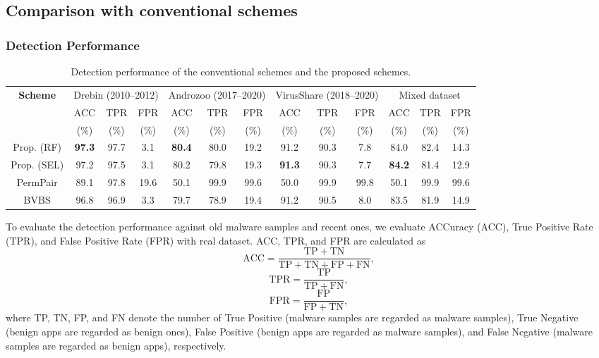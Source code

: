 \documentclass{ieeeaccess}
\begin{document}
\subsection{Comparison with conventional schemes} \label{sec:comparison}
\subsubsection{Detection Performance} \label{sec:detection_performance}
\begin{table}[t]
  \begin{center}
    \caption{Detection performance of the conventional schemes and the proposed schemes.}
    \label{tab:detection_performance} 
    \begin{tabular}{|c|c|c|c|c|c|c|c|c|c|c|c|c|} 
      \hline
      \multirow{3}{*}{\textbf{Scheme}} & \multicolumn{3}{c|}{Drebin (2010--2012) } & \multicolumn{3}{c|}{Androzoo (2017--2020)} & \multicolumn{3}{c|}{VirusShare (2018--2020)}& \multicolumn{3}{c|}{Mixed dataset}\\ \cline{2-13}
                                       & ACC  & TPR & FPR & ACC & TPR & FPR & ACC & TPR & FPR & ACC & TPR & FPR \\ 
                                       & (\%) & (\%) & (\%) & (\%) & (\%) & (\%) & (\%) & (\%) & (\%) & (\%) & (\%) & (\%) \\ \hline 
      Prop. (RF)  & \textbf{97.3} & 97.7 & 3.1 & \textbf{80.4} & 80.0 & 19.2 & 91.2 & 90.3 & 7.8 & 84.0 & 82.4 & 14.3 \\ 
      Prop. (SEL)  & 97.2 & 97.5 & 3.1 & 80.2 & 79.8 & 19.3 & \textbf{91.3} & 90.3 & 7.7 & \textbf{84.2} & 81.4 & 12.9 \\ 
      PermPair \cite{arora2019permpair}  & 89.1 & 97.8 & 19.6 & 50.1 & 99.9 & 99.6 & 50.0 & 99.9 & 99.8 & 50.1 & 99.9 & 99.6 \\ 
      BVBS \cite{liu2014two} & 96.8 & 96.9 & 3.3 & 79.7 & 78.9 & 19.4 & 91.2 & 90.5 & 8.0 & 83.5 & 81.9 & 14.9 \\ 
      \hline
    \end{tabular}
  \end{center}
\end{table} 
To evaluate the detection performance against old malware samples and recent ones, we evaluate ACCuracy (ACC), True Positive Rate (TPR), and False Positive Rate (FPR) with real dataset.
ACC, TPR, and FPR are calculated as
\begin{equation}
  \mathrm{ACC} = \frac{\mathrm{TP}+\mathrm{TN}}{\mathrm{TP} + \mathrm{TN} + \mathrm{FP} + \mathrm{FN}}, 
\end{equation}
\begin{equation}
  \mathrm{TPR} = \frac{\mathrm{TP}}{\mathrm{TP + FN}},
\end{equation}
\begin{equation}
  \mathrm{FPR} = \frac{\mathrm{FP}}{\mathrm{FP + TN}},
\end{equation}
where TP, TN, FP, and FN denote the number of True Positive (malware samples are regarded as malware samples), True Negative (benign apps are regarded as benign ones), False Positive (benign apps are regarded as malware samples), and False Negative (malware samples are regarded as benign apps), respectively.  
\end{document}
